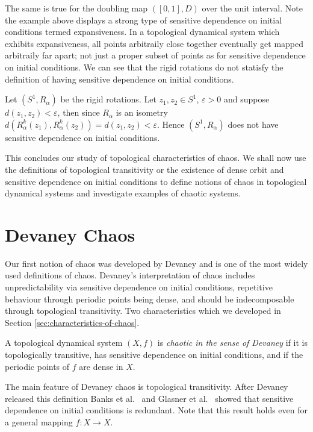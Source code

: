 The same is true for the doubling map $([0, 1], D)$ over the unit interval. Note the example above displays a strong type of sensitive dependence on initial conditions termed expansiveness. In a topological dynamical system which exhibits expansiveness, all points arbitraily close together eventually get mapped arbitraily far apart; not just a proper subset of points as for sensitive dependence on initial conditions. We can see that the rigid rotations do not statisfy the definition of having sensitive dependence on initial conditions.

\begin{exmp} \label{exmp:rigid-rotations-not-sensitive}
    Let $(S^1, R_\alpha)$ be the rigid rotations. Let $z_1,z_2 \in S^1$, $\varepsilon > 0$ and suppose $d(z_1, z_2) < \varepsilon$, then since $R_\alpha$ is an isometry $d(R_\alpha^k(z_1), R_\alpha^k(z_2)) = d(z_1, z_2) < \varepsilon$. Hence $(S^1, R_\alpha)$ does not have sensitive dependence on initial conditions.
\end{exmp}

This concludes our study of topological characteristics of chaos. We shall now use the definitions of topological transitivity or the existence of dense orbit and sensitive dependence on initial conditions to define notions of chaos in topological dynamical systems and investigate examples of chaotic systems.

\section{Devaney Chaos} \label{sec:devaney-chaos}

Our first notion of chaos was developed by Devaney \cite{devaney} and is one of the most widely used definitions of chaos. Devaney's interpretation of chaos includes unpredictability via sensitive dependence on initial conditions, repetitive behaviour through periodic points being dense, and should be indecomposable through topological transitivity. Two characteristics which we developed in Section \ref{sec:characteristics-of-chaos}.

\begin{defn}  \label{defn:devaney-chaos}
    A topological dynamical system $(X, f)$ is \emph{chaotic in the sense of Devaney} if it is topologically transitive, has sensitive dependence on initial conditions, and if the periodic points of $f$ are dense in $X$.
\end{defn}

The main feature of Devaney chaos is topological transitivity. After Devaney released this definition Banks et al.\ \cite{bbcds} and Glasner et al.\ \cite{glasner-weiss} showed that sensitive dependence on initial conditions is redundant. Note that this result holds even for a general mapping $f: X \to X$.

